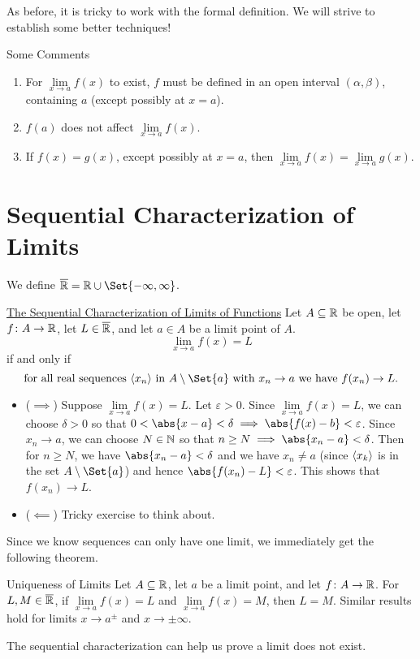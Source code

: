 As before, it is tricky to work with the formal definition. We will strive to establish some better techniques!

\begin{Remark}{Some Comments}{}
    \begin{enumerate}[(1)]
        \item For $ \lim\limits_{{x} \to {a}}f(x) $ to exist, $ f $ must be defined in an open interval $ (\alpha,\beta) $, containing
              $ a $ (except possibly at $ x=a $).
        \item $ f(a) $ does not affect $ \lim\limits_{{x} \to {a}}f(x) $.
        \item If $ f(x)=g(x) $, except possibly at $ x=a $, then $ \lim\limits_{{x} \to {a}}f(x)=\lim\limits_{{x} \to {a}}g(x) $.
    \end{enumerate}
\end{Remark}
\section{Sequential Characterization of Limits}
We define $ \ER=\R\cup\Set{-\infty,\infty} $.
\begin{Theorem}{\href{https://proofwiki.org/wiki/Sequential_Characterization_of_Limit_at_Positive_Infinity_of_Real_Function}{The Sequential Characterization of Limits of Functions}}{}
    Let $ A\subseteq \mathbb{R} $ be open, let $ f\colon A\to\mathbb{R} $, let $ L\in\overline{\mathbb{R}} $, and let $ a\in A $
    be a limit point of $ A $.
    \[ \lim\limits_{{x} \to {a}}f(x)=L  \]
    if and only if
    \[ \text{for all real sequences $ \sequence{x_n} $ in $A\setminus \Set{a}$ with $ x_n\to a $ we have $ f(x_n)\to L $}. \]
    \tcblower{}
    \begin{itemize}
        \item ($ \implies $) Suppose $ \lim\limits_{{x} \to {a}}f(x)=L $. Let $ \varepsilon>0 $.
              Since $ \lim\limits_{{x} \to {a}}f(x)=L $, we can choose $ \delta>0 $ so that $ 0<\abs{x-a}<\delta\implies \abs{f(x)-b}<\varepsilon $.
              Since $ x_n\to a $, we can choose $ N\in\mathbb{N} $ so that $ n\ge N\implies \abs{x_n-a}<\delta $. Then for $ n\ge N $,
              we have $ \abs{x_n-a}<\delta $ and we have $ x_n\ne a $
              (since $ \langle x_k\rangle $ is in the set $ A\setminus \Set{a} $) and hence $ \abs{f(x_n)-L}<\varepsilon $. This shows that $ f(x_n)\to L $.
        \item ($ \impliedby $) Tricky exercise to think about.
    \end{itemize}
\end{Theorem}
Since we know sequences can only have one limit, we immediately get the following theorem.
\begin{Theorem}{Uniqueness of Limits}{}
    Let $ A\subseteq\mathbb{R} $, let $ a $ be a limit point, and let $ f\colon A\to \mathbb{R} $.
    For $ L,M\in\overline{\mathbb{R}} $, if $ \lim\limits_{{x} \to {a}}f(x)=L $ and $ \lim\limits_{{x} \to {a}}f(x)=M $, then
    $ L=M $. Similar results hold for limits $ x\to a^{\pm} $ and $ x\to \pm\infty $.
\end{Theorem}
The sequential characterization can help us prove a limit does not exist.
